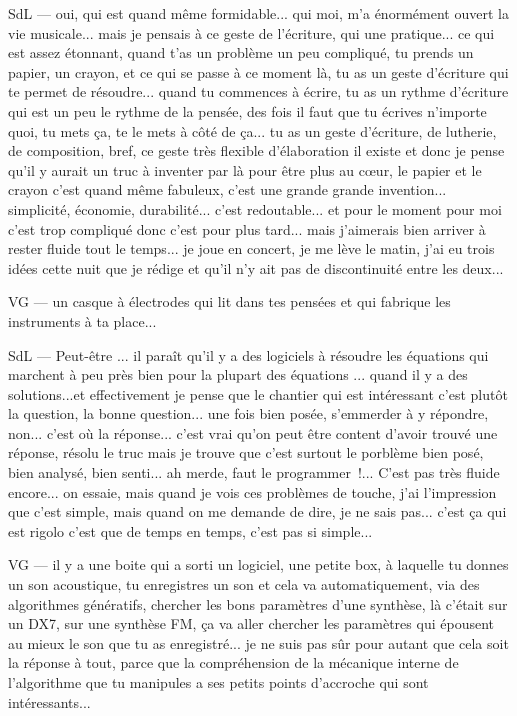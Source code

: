 SdL — oui, qui est quand même formidable... qui moi, m'a énormément ouvert la vie musicale... mais je pensais à ce geste de l'écriture, qui une pratique... ce qui est assez étonnant, quand t'as un problème un peu compliqué, tu prends un papier, un crayon, et ce qui se passe à ce moment là, tu as un geste d'écriture qui te permet de résoudre... quand tu commences à écrire, tu as un rythme d'écriture qui est un peu le rythme de la pensée, des fois il faut que tu écrives n'importe quoi, tu mets ça, te le mets à côté de ça... tu as un geste d'écriture, de lutherie, de composition, bref, ce geste très flexible d'élaboration il existe et donc je pense qu'il y aurait un truc à inventer par là pour être plus au cœur, le papier et le crayon c'est quand même fabuleux, c'est une grande grande invention... simplicité, économie, durabilité... c'est redoutable... et pour le moment pour moi c'est trop compliqué donc c'est pour plus tard... mais j'aimerais bien arriver à rester fluide tout le temps... je joue en concert, je me lève le matin, j'ai eu trois idées cette nuit que je rédige et qu'il n'y ait pas de discontinuité entre les deux... 

VG — un casque à électrodes qui lit dans tes pensées et qui fabrique les instruments à ta place... 

SdL — Peut-être ... il paraît qu'il y a des logiciels à résoudre les équations qui marchent à peu près bien pour la plupart des équations ... quand il y a des solutions...et effectivement je pense que le chantier qui est intéressant c'est plutôt la question, la bonne question... une fois bien posée, s'emmerder à y répondre, non... c'est où la réponse... c'est vrai qu'on peut être content d'avoir trouvé une réponse, résolu le truc mais je trouve que c'est surtout le porblème bien posé, bien analysé, bien senti... ah merde, faut le programmer !... C'est pas très fluide encore... on essaie, mais quand je vois ces problèmes de touche, j'ai l'impression que c'est simple, mais quand on me demande de dire, je ne sais pas... c'est ça qui est rigolo c'est que de temps en temps, c'est pas si simple... 

VG — il y a une boite qui a sorti un logiciel, une petite box, à laquelle tu donnes un son acoustique, tu enregistres un son et cela va automatiquement, via des algorithmes génératifs, chercher les bons paramètres d'une synthèse, là c'était sur un DX7, sur une synthèse FM, ça va aller chercher les paramètres qui épousent au mieux le son que tu as enregistré... je ne suis pas sûr pour autant que cela soit la réponse à tout, parce que la compréhension de la mécanique interne de l'algorithme que tu manipules a ses petits points d'accroche qui sont intéressants... 


